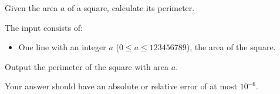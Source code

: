 

\newcommand{\maxa}{123456789}

Given the area $a$ of a square, calculate its perimeter.

\begin{Input}
    The input consists of:
    \begin{itemize}
        \item One line with an integer $a$ ($0\leq a\leq \maxa$), the area of the square.
    \end{itemize}
\end{Input}

\begin{Output}
    Output the perimeter of the square with area $a$.

    Your answer should have an absolute or relative error of at most $10^{-6}$.
\end{Output}
